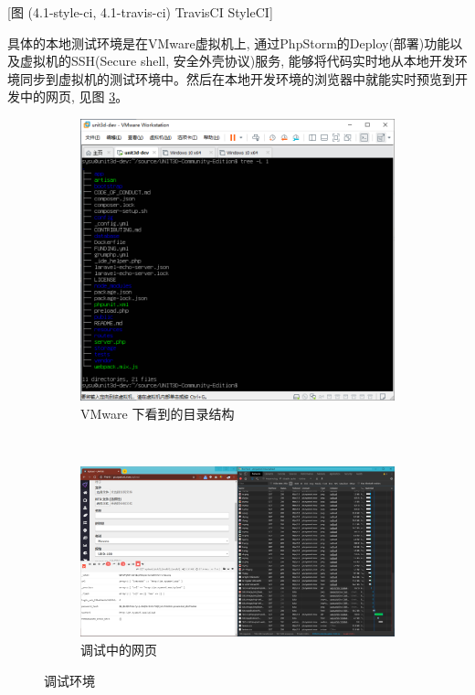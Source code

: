 [图 (4.1-style-ci, 4.1-travis-ci) TravisCI StyleCI]

具体的本地测试环境是在VMware虚拟机上, 通过PhpStorm的Deploy(部署)功能以及虚拟机的SSH(Secure shell, 安全外壳协议)服务, 能够将代码实时地从本地开发环境同步到虚拟机的测试环境中。然后在本地开发环境的浏览器中就能实时预览到开发中的网页, 见图 \ref{fig:devenv}。

\begin{figure}[h]
	\centering
    \begin{subfigure}{0.8\textwidth}
		\centering
		\includegraphics[width=\textwidth]{support-files/4.1-vwmare-unit3d-dev.png}
		\caption{VMware 下看到的目录结构}
		\label{fig:vmware}
	\end{subfigure} \\
    \begin{subfigure}{0.8\textwidth}
		\centering
		\includegraphics[width=\textwidth]{support-files/4.1-web-idehelper-chrome-devtool.png}
		\caption{调试中的网页}
		\label{fig:chromedevtool}
	\end{subfigure} 
    \caption{调试环境}
	\label{fig:devenv}
\end{figure}

